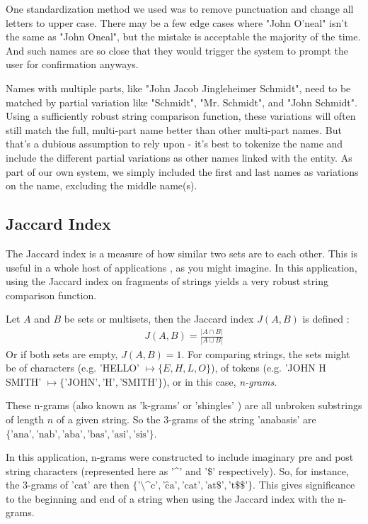 \documentclass[11pt]{article}
\begin{document}
One standardization method we used was to remove punctuation and change all letters to upper case.
There may be a few edge cases where "John O'neal" isn't the same as "John Oneal",
but the mistake is acceptable the majority of the time. And such names are so close that they would
trigger the system to prompt the user for confirmation anyways.

Names with multiple parts, like "John Jacob Jingleheimer Schmidt", need to be matched by
partial variation like "Schmidt", "Mr. Schmidt", and "John Schmidt". 
Using a sufficiently robust string comparison function, these variations will often 
still match the full, multi-part name better than other multi-part names.
But that's a dubious assumption to rely upon - it's best to tokenize the name and
include the different partial variations as other names linked with the entity.
As part of our own system, we simply included the first and last names as variations on
the name, excluding the middle name(s).

\subsection{Jaccard Index}
The Jaccard index is a measure of how similar two sets are to each other.
This is useful in a whole host of applications \cite{general}, as you might imagine. 
In this application, using the Jaccard index on fragments of strings yields a very
robust string comparison function.

Let $A$ and $B$ be sets or multisets, then the Jaccard index $J(A,B)$ is defined \cite{mining, comparison}:
\begin{align*}
    J(A, B) = \frac{\left| A \cap B \right|}{\left| A \cup B \right|}
\end{align*}
Or if both sets are empty, $J(A,B) = 1$.
For comparing strings, the sets might be of characters (e.g. 'HELLO' $\mapsto \{E, H, L, O\}$), 
of tokens (e.g. 'JOHN H SMITH' $\mapsto \{\text{'JOHN'}, \text{'H'}, \text{'SMITH'}\}$),
or in this case, {\em n-grams}.

These n-grams (also known as 'k-grams' or 'shingles' \cite{mining}) are all unbroken substrings of 
length $n$ of a given string. So the 3-grams of the string 'anabasis' are 
$\{\text{'ana'}, \text{'nab'}, \text{'aba'}, \text{'bas'}, \text{'asi'}, \text{'sis'}\}$. 

In this application, n-grams were constructed to include imaginary pre and post string characters
(represented here as '\^{}' and '\$' respectively). So, for instance, the 3-grams of 'cat' are then
$\{\text{'\^{}\^{}c'}, \text{'\^{}ca'}, \text{'cat'}, \text{'at\$'}, \text{'t\$\$'}\}$. This gives
significance to the beginning and end of a string when using the Jaccard index with the n-grams.
\end{document}
